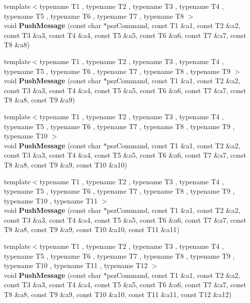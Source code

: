 \begin{DoxyCompactItemize}
\item 
\mbox{\label{class_c_node_af91d09012aa7e879be4b488b0bba903d}} 
{\footnotesize template$<$typename T1 , typename T2 , typename T3 , typename T4 , typename T5 , typename T6 , typename T7 , typename T8 $>$ }\\void {\bfseries Push\+Message} (const char $\ast$psz\+Command, const T1 \&a1, const T2 \&a2, const T3 \&a3, const T4 \&a4, const T5 \&a5, const T6 \&a6, const T7 \&a7, const T8 \&a8)
\item 
\mbox{\label{class_c_node_a1af04d8219e8e6aafe5b6446000cd9ff}} 
{\footnotesize template$<$typename T1 , typename T2 , typename T3 , typename T4 , typename T5 , typename T6 , typename T7 , typename T8 , typename T9 $>$ }\\void {\bfseries Push\+Message} (const char $\ast$psz\+Command, const T1 \&a1, const T2 \&a2, const T3 \&a3, const T4 \&a4, const T5 \&a5, const T6 \&a6, const T7 \&a7, const T8 \&a8, const T9 \&a9)
\item 
\mbox{\label{class_c_node_a64f2ffdff9a32458d6fede8324dfd59f}} 
{\footnotesize template$<$typename T1 , typename T2 , typename T3 , typename T4 , typename T5 , typename T6 , typename T7 , typename T8 , typename T9 , typename T10 $>$ }\\void {\bfseries Push\+Message} (const char $\ast$psz\+Command, const T1 \&a1, const T2 \&a2, const T3 \&a3, const T4 \&a4, const T5 \&a5, const T6 \&a6, const T7 \&a7, const T8 \&a8, const T9 \&a9, const T10 \&a10)
\item 
\mbox{\label{class_c_node_afeef78359562e34d7e62cbea4bc628fd}} 
{\footnotesize template$<$typename T1 , typename T2 , typename T3 , typename T4 , typename T5 , typename T6 , typename T7 , typename T8 , typename T9 , typename T10 , typename T11 $>$ }\\void {\bfseries Push\+Message} (const char $\ast$psz\+Command, const T1 \&a1, const T2 \&a2, const T3 \&a3, const T4 \&a4, const T5 \&a5, const T6 \&a6, const T7 \&a7, const T8 \&a8, const T9 \&a9, const T10 \&a10, const T11 \&a11)
\item 
\mbox{\label{class_c_node_a9e9e15c8ba33b19041cbf2c2ffdbe9ab}} 
{\footnotesize template$<$typename T1 , typename T2 , typename T3 , typename T4 , typename T5 , typename T6 , typename T7 , typename T8 , typename T9 , typename T10 , typename T11 , typename T12 $>$ }\\void {\bfseries Push\+Message} (const char $\ast$psz\+Command, const T1 \&a1, const T2 \&a2, const T3 \&a3, const T4 \&a4, const T5 \&a5, const T6 \&a6, const T7 \&a7, const T8 \&a8, const T9 \&a9, const T10 \&a10, const T11 \&a11, const T12 \&a12)

\end{DoxyCompactItemize}
